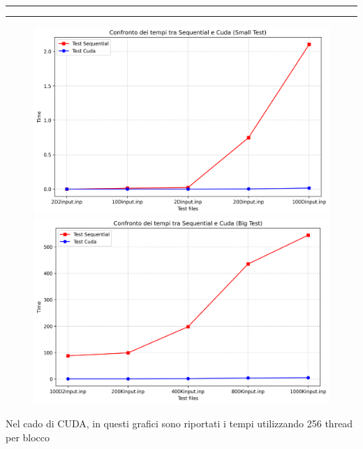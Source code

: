 \documentclass{article}
\begin{document}
  \begin{center}
    \rule{2.5cm}{1pt}  \rule{2.5cm}{1pt}
  \end{center}
  \begin{figure}[ht]
    \centering
    \begin{minipage}{0.45\textwidth}
      \centering 
      \includegraphics[width=\linewidth]{../test_csv/plots/plot_cuda_small_slurm.png}
    \end{minipage}
    \begin{minipage}{0.45\textwidth}
      \centering 
      \includegraphics[width=\linewidth]{../test_csv/plots/plot_cuda_big_slurm.png}
    \end{minipage}
  \end{figure}
  \begin{center}
    \small *Nel cado di CUDA, in questi grafici sono riportati i tempi utilizzando 256 thread per blocco
  \end{center}
\end{document}
